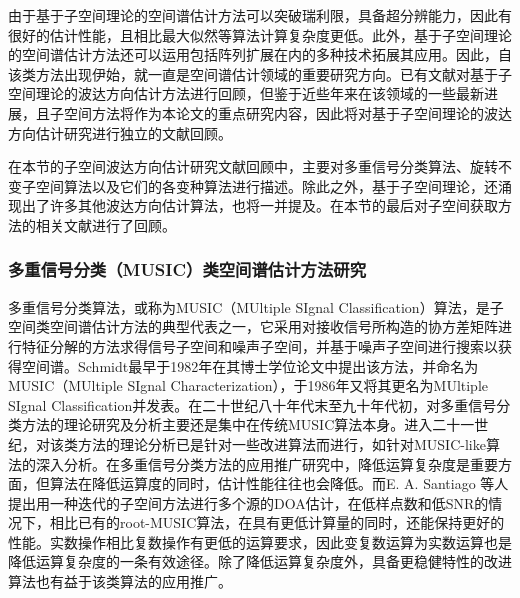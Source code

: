 由于基于子空间理论的空间谱估计方法可以突破瑞利限，具备超分辨能力，因此有很好的估计性能，且相比最大似然等算法计算复杂度更低。此外，基于子空间理论的空间谱估计方法还可以运用包括阵列扩展在内的多种技术拓展其应用。因此，自该类方法出现伊始，就一直是空间谱估计领域的重要研究方向。已有文献对基于子空间理论的波达方向估计方法进行回顾，但鉴于近些年来在该领域的一些最新进展，且子空间方法将作为本论文的重点研究内容，因此将对基于子空间理论的波达方向估计研究进行独立的文献回顾。


在本节的子空间波达方向估计研究文献回顾中，主要对多重信号分类算法、旋转不变子空间算法以及它们的各变种算法进行描述。除此之外，基于子空间理论，还涌现出了许多其他波达方向估计算法，也将一并提及。在本节的最后对子空间获取方法的相关文献进行了回顾。

\subsubsection{多重信号分类（MUSIC）类空间谱估计方法研究}
多重信号分类算法，或称为MUSIC（MUltiple SIgnal Classification）算法，是子空间类空间谱估计方法的典型代表之一，它采用对接收信号所构造的协方差矩阵进行特征分解的方法求得信号子空间和噪声子空间，并基于噪声子空间进行搜索以获得空间谱。Schmidt最早于1982年在其博士学位论文中提出该方法，并命名为MUSIC（MUltiple SIgnal Characterization），于1986年又将其更名为MUltiple SIgnal Classification并发表。在二十世纪八十年代末至九十年代初，对多重信号分类方法的理论研究及分析主要还是集中在传统MUSIC算法本身。进入二十一世纪，对该类方法的理论分析已是针对一些改进算法而进行，如针对MUSIC-like算法的深入分析。在多重信号分类方法的应用推广研究中，降低运算复杂度是重要方面，但算法在降低运算度的同时，估计性能往往也会降低。而E. A. Santiago 等人提出用一种迭代的子空间方法进行多个源的DOA估计，在低样点数和低SNR的情况下，相比已有的root-MUSIC算法，在具有更低计算量的同时，还能保持更好的性能。实数操作相比复数操作有更低的运算要求，因此变复数运算为实数运算也是降低运算复杂度的一条有效途径。除了降低运算复杂度外，具备更稳健特性的改进算法也有益于该类算法的应用推广。
